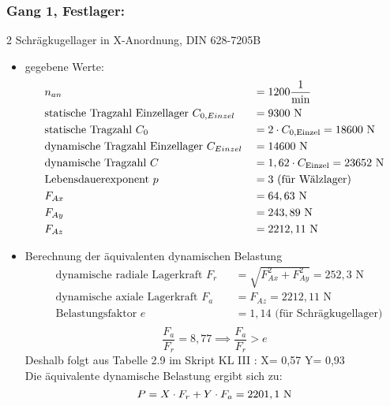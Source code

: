 \subsubsection{Gang 1, Festlager:} 2 Schrägkugellager in X-Anordnung, DIN 628-7205B\\
\begin{itemize}
	\item gegebene Werte:
	\begin{align*}
	&n_{an} &&= 1200 \frac{1}{\text{min}} \\
	&\text{statische Tragzahl Einzellager } C_{0,Einzel} &&= 9300 \text{ N}\\
	&\text{statische Tragzahl } C_0 &&= 2 \cdot C_{0,\text{Einzel}} = 18600 \text{ N} \\
	&\text{dynamische Tragzahl Einzellager } C_{Einzel} &&= 14600 \text{ N} \\
	&\text{dynamische Tragzahl } C &&= 1,62 \cdot C_{\text{Einzel}} = 23652 \text{ N}\\
	&\text{Lebensdauerexponent } p &&= 3 \text{ (für Wälzlager)} \\
	&F_{Ax} && = 64,63 \text{ N}\\
	&F_{Ay} && = 243,89 \text{ N}\\
	&F_{Az} && = 2212,11 \text{ N}\\
	\end{align*} 
	\item Berechnung der äquivalenten dynamischen Belastung
	\begin{align*}
	&\text{dynamische radiale Lagerkraft } F_r&& = \sqrt{F_{Ax}^2 + F_{Ay}^2 } = 252,3 \text{ N} \\
	&\text{dynamische axiale Lagerkraft } F_a&& = F_{Az} = 2212,11 \text{ N}\\
	&\text{Belastungsfaktor } e &&= 1,14 \text{ (für Schrägkugellager)} \\
	\end{align*} 
	\[\frac{F_a}{F_r} = 8,77 \implies \frac{F_a}{F_r} > e\]
	Deshalb folgt aus Tabelle 2.9 im Skript KL III : X= 0,57 \text{, } Y= 0,93 \\
	Die äquivalente dynamische Belastung ergibt sich zu: 
	\[
	P= X \cdot F_r + Y \cdot F_a = 2201,1 \text{ N}
	\]
\end{itemize}

